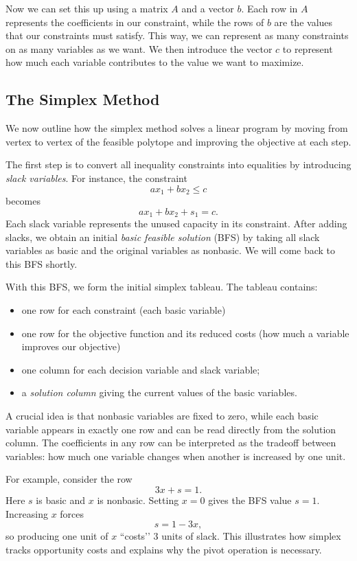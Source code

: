 \documentclass[11pt]{article}
\begin{document}
Now we can set this up using a matrix \(A\) and a vector \(b\). Each row in \(A\) represents the coefficients in our constraint, while the rows of \(b\) are the values that our constraints must satisfy. This way, we can represent as many constraints on as many variables as we want. We then introduce the vector \(c\) to represent how much each variable contributes to the value we want to maximize.


\subsection{The Simplex Method}

We now outline how the simplex method solves a linear program by moving from vertex to vertex of the feasible polytope and improving the objective at each step.

The first step is to convert all inequality constraints into equalities by introducing \emph{slack variables}. For instance, the constraint
\[
ax_1 + bx_2 \le c
\]
becomes
\[
ax_1 + bx_2 + s_1 = c.
\]
Each slack variable represents the unused capacity in its constraint. After adding slacks, we obtain an initial \emph{basic feasible solution} (BFS) by taking all slack variables as basic and the original variables as nonbasic. We will come back to this BFS shortly.

With this BFS, we form the initial simplex tableau. The tableau contains:
\begin{itemize}
    \item one row for each constraint (each basic variable)
    \item one row for the objective function and its reduced costs (how much a variable improves our objective)
    \item one column for each decision variable and slack variable;
    \item a \emph{solution column} giving the current values of the basic variables.
\end{itemize}

A crucial idea is that nonbasic variables are fixed to zero, while each basic variable appears in exactly one row and can be read directly from the solution column. The coefficients in any row can be interpreted as the tradeoff between variables: how much one variable changes when another is increased by one unit.

For example, consider the row
\[
3x + s = 1.
\]
Here \(s\) is basic and \(x\) is nonbasic. Setting \(x = 0\) gives the BFS value \(s = 1\). Increasing \(x\) forces
\[
s = 1 - 3x,
\]
so producing one unit of \(x\) “costs’’ 3 units of slack. This illustrates how simplex tracks opportunity costs and explains why the pivot operation is necessary.
\end{document}
